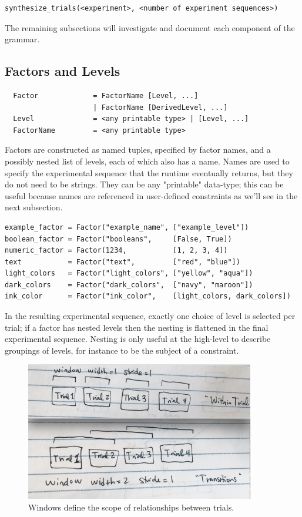 \begin{verbatim}
synthesize_trials(<experiment>, <number of experiment sequences>)
\end{verbatim}

The remaining subsections will investigate and document each component of the grammar.

\subsection{Factors and Levels}

\begin{verbatim}
  Factor             = FactorName [Level, ...]
                     | FactorName [DerivedLevel, ...]
  Level              = <any printable type> | [Level, ...]
  FactorName         = <any printable type>
\end{verbatim}

Factors are constructed as named tuples, specified by factor names, and a possibly nested list of levels, each of which also has a name. Names are used to specify the experimental sequence that the runtime eventually returns, but they do not need to be strings. They can be any "printable" data-type; this can be useful because names are referenced in user-defined constraints as we'll see in the next subsection.

\begin{verbatim}
example_factor = Factor("example_name", ["example_level"])
boolean_factor = Factor("booleans",     [False, True])
numeric_factor = Factor(1234,           [1, 2, 3, 4])
text           = Factor("text",         ["red", "blue"])
light_colors   = Factor("light_colors", ["yellow", "aqua"])
dark_colors    = Factor("dark_colors",  ["navy", "maroon"])
ink_color      = Factor("ink_color",    [light_colors, dark_colors])
\end{verbatim}

In the resulting experimental sequence, exactly one choice of level is selected per trial; if a factor has nested levels then the nesting is flattened in the final experimental sequence. Nesting is only useful at the high-level to describe groupings of levels, for instance to be the subject of a constraint.

\begin{figure}[t]
    \centerline{\includegraphics[origin=c,width=10cm]{fig_windows}}
    \caption{Windows define the scope of relationships between trials.}%
    \label{fig:windows}%
\end{figure}


